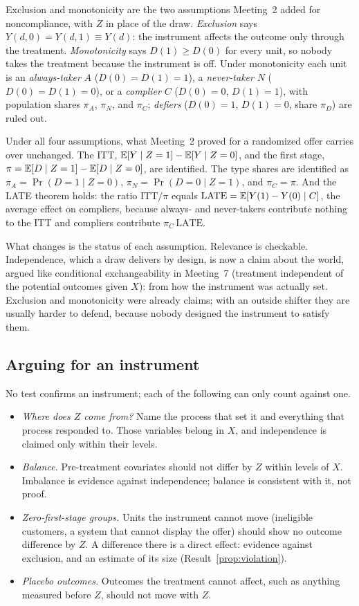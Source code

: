 \documentclass[11pt]{article}
\begin{document}
Exclusion and monotonicity are the two assumptions Meeting~2 added for noncompliance, with $Z$ in place of the draw.
\emph{Exclusion} says $Y(d, 0) = Y(d, 1) \equiv Y(d)$: the instrument affects the outcome only through the treatment.
\emph{Monotonicity} says $D(1) \ge D(0)$ for every unit, so nobody takes the treatment because the instrument is off. Under
monotonicity each unit is an \emph{always-taker} $A$ ($D(0) = D(1) = 1$), a \emph{never-taker} $N$ ($D(0) = D(1) = 0$), or a
\emph{complier} $C$ ($D(0) = 0$, $D(1) = 1$), with population shares $\pi_A$, $\pi_N$, and $\pi_C$; \emph{defiers} ($D(0) = 1$,
$D(1) = 0$, share $\pi_D$) are ruled out.

Under all four assumptions, what Meeting~2 proved for a randomized offer carries over unchanged. The ITT, $\mathbb{E}[Y \mid Z=1] - \mathbb{E}[Y \mid Z=0]$, and the
first stage, $\pi = \mathbb{E}[D \mid Z=1] - \mathbb{E}[D \mid Z=0]$, are identified. The type shares are identified as
$\pi_A = \Pr(D=1 \mid Z=0)$, $\pi_N = \Pr(D=0 \mid Z=1)$, and $\pi_C = \pi$. And the LATE theorem holds: the ratio
$\text{ITT}/\pi$ equals $\text{LATE} = \mathbb{E}[Y(1) - Y(0) \mid C]$, the average effect on compliers, because always- and
never-takers contribute nothing to the ITT and compliers contribute $\pi_C\,\text{LATE}$.

What changes is the status of each assumption. Relevance is checkable. Independence, which a draw delivers by design, is now a
claim about the world, argued like conditional exchangeability in Meeting~7 (treatment independent of the potential outcomes
given $X$): from how the instrument was actually set. Exclusion and monotonicity were already claims; with an outside shifter
they are usually harder to defend, because nobody designed the instrument to satisfy them.

\subsection{Arguing for an instrument}

No test confirms an instrument; each of the following can only count against one.
\begin{itemize}
  \item \emph{Where does $Z$ come from?} Name the process that set it and everything that process responded to. Those
  variables belong in $X$, and independence is claimed only within their levels.
  \item \emph{Balance.} Pre-treatment covariates should not differ by $Z$ within levels of $X$. Imbalance is evidence against
  independence; balance is consistent with it, not proof.
  \item \emph{Zero-first-stage groups.} Units the instrument cannot move (ineligible customers, a system that cannot display
  the offer) should show no outcome difference by $Z$. A difference there is a direct effect: evidence against exclusion,
  and an estimate of its size (Result~\ref{prop:violation}).
  \item \emph{Placebo outcomes.} Outcomes the treatment cannot affect, such as anything measured before $Z$, should not move with $Z$.
\end{itemize}
\end{document}

